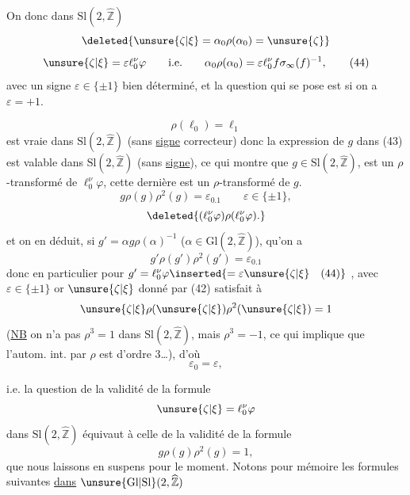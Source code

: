 On  donc dans $\mathrm{Sl}(2,\widehat{\mathbb Z})$
\[
 \deleted{\unsure{\zeta|\xi}=\alpha_0\rho(\alpha_0)=\unsure{\zeta}}
\]
\[
 \unsure{\zeta|\xi}=\varepsilon\ell_0^\nu\varphi
 \qquad\text{i.e.}\qquad
 \alpha_0\rho(\alpha_0)=\varepsilon\ell_0^\nu f\sigma_\infty(f)^{-1},
 \tag{44}
\]
avec un signe $\varepsilon\in\{\pm1\}$ bien déterminé, et la question qui se pose est si on a  $\varepsilon=+1$.

\[
 \rho(\ell_0)=\ell_1
\]
est vraie dans $\mathrm{Sl}(2,\widehat{\mathbb Z})$ (sans \uline{signe} correcteur) donc la  expression de $g$ dans (43) est valable dans $\mathrm{Sl}(2,\widehat{\mathbb Z})$ (sans \uline{signe}), ce qui montre que $g\in\mathrm{Sl}(2,\widehat{\mathbb Z})$,  est un $\rho$-transformé de $\ell_0^\nu\varphi$,  cette dernière est un $\rho$-transformé de $g$.
\[
 g\rho(g)\rho^2(g)=\varepsilon_0.1
 \qquad\varepsilon\in\{\pm1\},
\]
\[
 \deleted{(\ell_0^\nu\varphi)\rho(\ell_0^\nu\varphi).}
\]
et  on en déduit, si $g'=\alpha g\rho(\alpha)^{-1}$
\deleted{\unsure{$\rho^2\in$}} ($\alpha\in\mathrm{Gl}(2,\widehat{\mathbb Z})$), qu'on a
\[
 g'\rho(g')\rho^2(g')=\varepsilon_0.1
\]
donc en particulier pour $g'=\ell_0^\nu\varphi\inserted{=\varepsilon\unsure{\zeta|\xi}\quad\text{(44)}}$ , avec $\varepsilon\in\{\pm1\}$  or $\unsure{\zeta|\xi}$ donné par (42) satisfait à
\[
 \unsure{\zeta|\xi}\rho(\unsure{\zeta|\xi})\rho^2(\unsure{\zeta|\xi})=1
\]
(\uline{NB} on n'a pas $\rho^3=1$ dans $\mathrm{Sl}(2,\widehat{\mathbb Z})$, mais $\rho^3=-1$, ce qui implique que l'autom. int.   par $\rho$ est d'ordre 3\ldots), d'où
\[
 \varepsilon_0=\varepsilon,
\]


i.e. la question de la validité de la formule
\[
 \unsure{\zeta|\xi}=\ell_0^\nu\varphi
\]
dans $\mathrm{Sl}(2,\widehat{\mathbb Z})$ équivaut à celle de la validité de la formule
\[
 g\rho(g)\rho^2(g)=1,
\]
que nous laissons en suspens pour le moment. Notons pour mémoire les formules suivantes \uline{dans} \uline{$\unsure{\mathrm{Gl}|\mathrm{Sl}}(2,\widehat{\mathbb Z})$}


